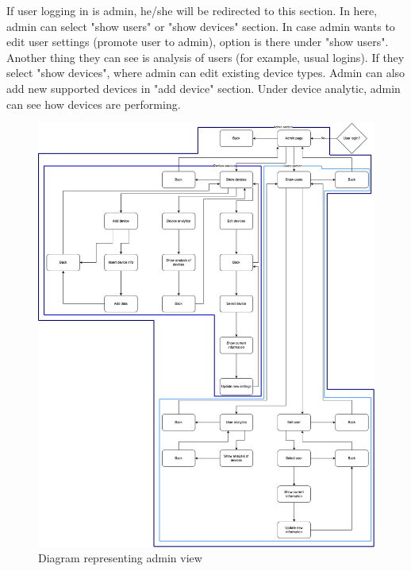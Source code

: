 If user logging in is admin, he/she will be redirected to this section. In here, admin can select "show users" or "show devices" section. In case admin wants to edit user settings (promote user to admin), option is there under "show users". Another thing they can see is analysis of users (for example, usual logins). If they select "show devices", where admin can edit existing device types. Admin can also add new supported devices in "add device" section. Under device analytic, admin can see how devices are performing.
\begin{figure}[H]
\includegraphics[scale=0.35]{img/UI-UI-admin-section.jpeg}
\centering
\caption{Diagram representing admin view}
\end{figure}

